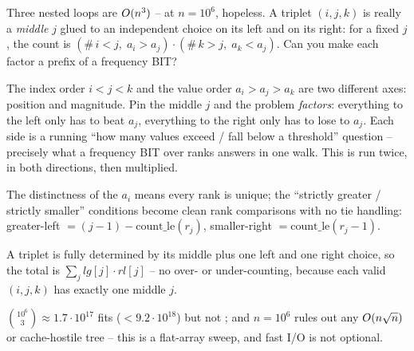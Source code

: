 \begin{attemptgate}
Three nested loops are \(O(n^3)\) -- at \(n=10^6\), hopeless.  A triplet
\((i,j,k)\) is really a \emph{middle} \(j\) glued to an independent choice
on its left and on its right: for a fixed \(j\), the count is
\((\#\,i<j,\;a_i>a_j)\cdot(\#\,k>j,\;a_k<a_j)\).  Can you make each factor a
prefix of a frequency BIT?
\end{attemptgate}

The index order \(i<j<k\) and the value order \(a_i>a_j>a_k\) are two
different axes: position and magnitude.  Pin the middle \(j\) and the problem
\emph{factors}: everything to the left only has to beat \(a_j\), everything
to the right only has to lose to \(a_j\).  Each side is a running ``how many
values exceed / fall below a threshold'' question -- precisely what a
frequency BIT over ranks answers in one walk.  This is
 run twice, in both directions, then multiplied.

\begin{observation}
The distinctness of the \(a_i\) means every rank is unique; the ``strictly
greater / strictly smaller'' conditions become clean rank comparisons with no
tie handling: greater-left \(=(j-1)-\text{count\_le}(r_j)\), smaller-right
\(=\text{count\_le}(r_j-1)\).
\end{observation}
\begin{observation}
A triplet is fully determined by its middle plus one left and one right
choice, so the total is \(\sum_j \mathit{lg}[j]\cdot\mathit{rl}[j]\) -- no
over- or under-counting, because each valid \((i,j,k)\) has exactly one
middle \(j\).
\end{observation}
\begin{observation}
\(\binom{10^6}{3}\approx1.7\cdot10^{17}\) fits  (\(<9.2\cdot
10^{18}\)) but not ; and \(n=10^6\) rules out any
\(O(n\sqrt n)\) or cache-hostile tree -- this is a flat-array sweep, and
fast I/O is not optional.
\end{observation}

